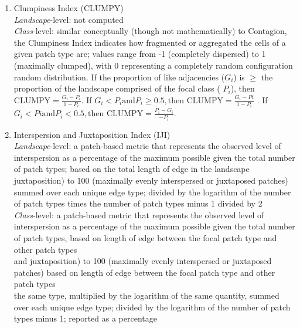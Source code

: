 \begin{enumerate}
		
	\item Clumpiness Index (CLUMPY)\\
	\emph{Landscape}-level: not computed  	\\
	\emph{Class}-level: similar conceptually (though not mathematically) to Contagion, the Clumpiness Index indicates how fragmented or aggregated 
the cells of a given patch type are; values range from -1 (completely dispersed) to 1 (maximally clumped), with 0 representing a completely 
random configuration 	\\
random distribution. If the proportion of like adjacencies ($G_i$) is $\geq$ the proportion of the landscape comprised of the focal class (
$P_i$), then $\text{CLUMPY} = \frac{G_i - P_i}{1 - P_i}$. If $G_i < P_i \text{and} P_i \geq 0.5, \text{then CLUMPY} = \frac{G_i - Pi}{1 - P_i}$
. If $G_i < Pi \text{and} P_i < 0.5, \text{then CLUMPY} = \frac{P_i - G_i}{-P_i}$.	\\
	
	\item Interspersion and Juxtaposition Index (IJI) \\
	\emph{Landscape}-level: a patch-based metric that represents the observed level of interspersion as a percentage of the maximum possible given 
the total number of patch types; based on the total length of edge in the landscape 	\\
juxtaposition) to 100 (maximally evenly interspersed or juxtaposed patches) 	\\
summed over each unique edge type;  divided by the logarithm of the number of patch types times the number of patch types minus 1 divided by 2 
	\\
	\emph{Class}-level: a patch-based metric that represents the observed level of interspersion as a percentage of the maximum possible given the 
total number of patch types, based on length of edge between the focal patch type and other patch types 	\\
and juxtaposition) to 100 (maximally evenly interspersed or juxtaposed patches) based on length of edge between the focal patch type and other 
patch types 	\\
the same type, multiplied by the logarithm of the same quantity, summed over each unique edge type; divided by the logarithm of the number of 
patch types minus 1; reported as a percentage	\\
	

\end{enumerate}
